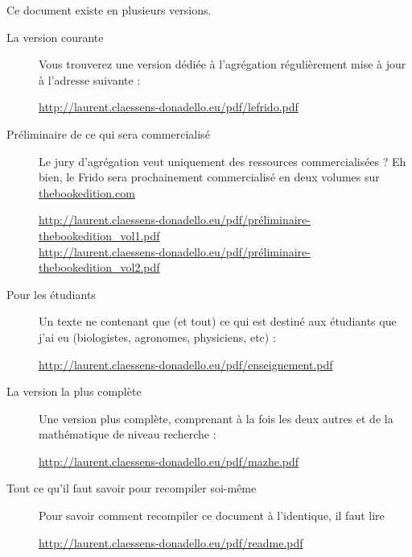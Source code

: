 
\thispagestyle{empty}

Ce document existe en plusieurs versions.
\begin{description}

    \item[La version courante] 

        Vous trouverez une version dédiée à l'agrégation régulièrement mise à jour à l'adresse suivante :
        \begin{center}
            \url{http://laurent.claessens-donadello.eu/pdf/lefrido.pdf}
        \end{center}

    \item[Préliminaire de ce qui sera commercialisé]

        Le jury d'agrégation veut uniquement des ressources commercialisées ? Eh bien, le Frido sera prochainement commercialisé en deux volumes sur \href{http://www.thebookedition.com/fr/}{thebookedition.com}
        \begin{center}
            \url{http://laurent.claessens-donadello.eu/pdf/préliminaire-thebookedition_vol1.pdf}\\
            \url{http://laurent.claessens-donadello.eu/pdf/préliminaire-thebookedition_vol2.pdf}
        \end{center}
        
    \item[Pour les étudiants]

        Un texte ne contenant que (et tout) ce qui est destiné aux étudiants que j'ai eu (biologistes, agronomes, physiciens, etc) :
        \begin{center}
        \url{http://laurent.claessens-donadello.eu/pdf/enseignement.pdf}
        \end{center}

    \item[La version la plus complète]

        Une version plus complète, comprenant à la fois les deux autres et de la mathématique de niveau recherche : 
        \begin{center}
        \url{http://laurent.claessens-donadello.eu/pdf/mazhe.pdf}
        \end{center}

    \item[Tout ce qu'il faut savoir pour recompiler soi-même]
        Pour savoir comment recompiler ce document à l'identique, il faut lire
        \begin{center}
            \url{http://laurent.claessens-donadello.eu/pdf/readme.pdf}
        \end{center}

\end{description}


\vfill

\LogoEtLicence
\clearpage
